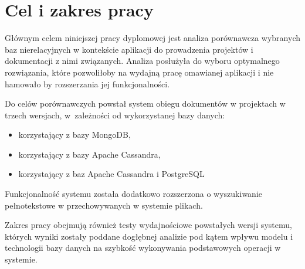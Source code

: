 \section*{Cel i zakres pracy}

Głównym celem niniejszej pracy dyplomowej jest analiza porównawcza wybranych baz nierelacyjnych w kontekście aplikacji do prowadzenia projektów i dokumentacji z nimi związanych. 
Analiza posłużyła do wyboru optymalnego rozwiązania, które pozwoliłoby na wydajną pracę omawianej aplikacji i nie hamowało by rozszerzania jej funkcjonalności.

Do celów porównawczych powstał system obiegu dokumentów w projektach w trzech wersjach, w~zależności od wykorzystanej bazy danych:
\begin{itemize}
    \item korzystający z bazy MongoDB,
    \item korzystający z bazy Apache Cassandra,
    \item korzystający z baz Apache Cassandra i PostgreSQL
\end{itemize}
Funkcjonalność systemu została dodatkowo rozszerzona o wyszukiwanie pełnotekstowe w przechowywanych w systemie plikach.

Zakres pracy obejmują również testy wydajnościowe powstałych wersji systemu, których wyniki zostały poddane dogłębnej analizie pod kątem wpływu modelu i technologii bazy danych na szybkość wykonywania podstawowych operacji w systemie.